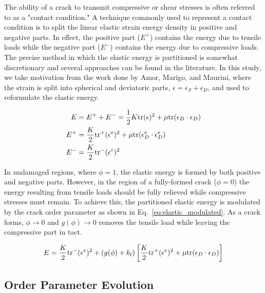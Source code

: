 The ability of a crack to transmit compressive or shear stresses is often referred to as a "contact condition." A technique commonly used to represent a contact condition is to split the linear elastic strain energy density in positive and negative parts. In effect, the positive part ($E^+$) contains the energy due to tensile loads while the negative part ($E^-$) contains the energy due to compressive loads. The precise method in which the elastic energy is partitioned is somewhat discretionary and several approaches can be found in the literature. In this study, we take motivation from the work done by Amor, Marigo, and Maurini, where the strain is split into spherical and deviatoric parts, $\epsilon = \epsilon_S + \epsilon_D$, and used to reformulate the elastic energy.

\begin{align}\label{eq:energy_split}
E &= E^+ + E^- = \frac{1}{2}K\text{tr}(\epsilon)^2 + \mu\text{tr}(\epsilon_D\cdot\epsilon_D)\\
E^+ &= \frac{K}{2}\text{tr}^+(\epsilon^e)^2 + \mu\text{tr}(\epsilon_D^e\cdot\epsilon_D^e)\\
E^- &= \frac{K}{2}\text{tr}^-(\epsilon^e)^2
\end{align}

In undamaged regions, where $\phi=1$, the elastic energy is formed by both positive and negative parts. However, in the region of a fully-formed crack ($\phi = 0$) the energy resulting from tensile loads should be fully relieved while compressive stresses must remain. To achieve this, the partitioned elastic energy is modulated by the crack order parameter as shown in Eq.~\ref{eq:elastic_modulated}. As a crack forms, $\phi\rightarrow 0$ and $g(\phi)\rightarrow 0$ removes the tensile load while leaving the compressive part in tact.

\begin{align}\label{eq:elastic_modulated}
E = \frac{K}{2}\text{tr}^-(\epsilon^e)^2 + (g(\phi)+k_l)\left[\frac{K}{2}\text{tr}^+(\epsilon^e)^2 + \mu\text{tr}(\epsilon_D\cdot\epsilon_D)\right]	
\end{align}



\subsection{Order Parameter Evolution}

